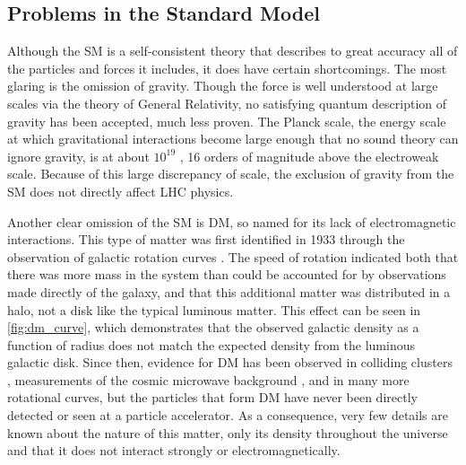 \subsection{Problems in the Standard Model}
\label{sec:sm_problems}

Although the \ac{SM} is a self-consistent theory that describes to great accuracy all of the particles and forces it includes, it does have certain shortcomings. The most glaring is the omission of gravity. Though the force is well understood at large scales via the theory of General Relativity, no satisfying quantum description of gravity has been accepted, much less proven. The Planck scale, the energy scale at which gravitational interactions become large enough that no sound theory can ignore gravity, is at about $10^{19}$ \GeV, 16 orders of magnitude above the electroweak scale. Because of this large discrepancy of scale, the exclusion of gravity from the \ac{SM} does not directly affect \ac{LHC} physics. 

Another clear omission of the \ac{SM} is \acf{DM}, so named for its lack of electromagnetic interactions. This type of matter was first identified in 1933 through the observation of galactic rotation curves \cite{zwicky}. The speed of rotation indicated both that there was more mass in the system than could be accounted for by observations made directly of the galaxy, and that this additional matter was distributed in a halo, not a disk like the typical luminous matter. This effect can be seen in \autoref{fig:dm_curve}, which demonstrates that the observed galactic density as a function of radius does not match the expected density from the luminous galactic disk. Since then, evidence for \ac{DM} has been observed in colliding clusters \cite{astro-ph/0608407}, measurements of the cosmic microwave background \cite{0803.0732}, and in many more rotational curves, but the particles that form \ac{DM} have never been directly detected or seen at a particle accelerator. As a consequence, very few details are known about the nature of this matter, only its density throughout the universe and that it does not interact strongly or electromagnetically. 

